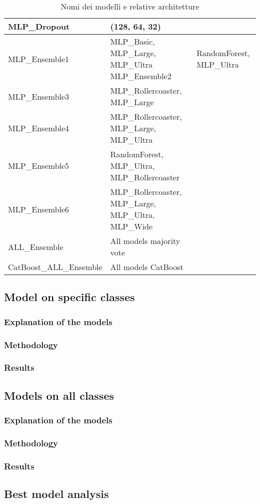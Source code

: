 \begin{table}[h!]
\begin{tabular}{|l|l|}
        MLP\_Dropout            & (128, 64, 32)                                         \\ \hline
        MLP\_Ensemble1          & \footnotesize{ MLP\_Basic, MLP\_Large, MLP\_Ultra     \\ }\hline
        MLP\_Ensemble2          & RandomForest, MLP\_Ultra                              \\ \hline
        MLP\_Ensemble3          & MLP\_Rollercoaster, MLP\_Large                        \\ \hline
        MLP\_Ensemble4          & MLP\_Rollercoaster, MLP\_Large, MLP\_Ultra            \\ \hline
        MLP\_Ensemble5          & RandomForest, MLP\_Ultra, MLP\_Rollercoaster          \\ \hline
        MLP\_Ensemble6          & MLP\_Rollercoaster, MLP\_Large, MLP\_Ultra, MLP\_Wide \\ \hline
        ALL\_Ensemble           & All models majority vote                              \\ \hline
        CatBoost\_ALL\_Ensemble & All models CatBoost                                   \\ \hline
    \end{tabular}
    \caption{Nomi dei modelli e relative architetture}
    \label{tab:models}
\end{table}

\subsection{Model on specific classes}

\subsubsection{Explanation of the models}
\subsubsection{Methodology}
\subsubsection{Results}

\subsection{Models on all classes}
\subsubsection{Explanation of the models}
\subsubsection{Methodology}
\subsubsection{Results}

\subsection{Best model analysis}
